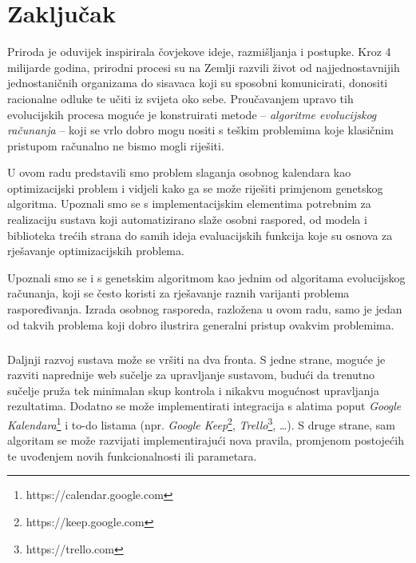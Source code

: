 \documentclass[times, utf8, zavrsni]{fer}
\begin{document}

\chapter{Zaključak}
Priroda je oduvijek inspirirala čovjekove ideje, razmišljanja i postupke. Kroz 4 milijarde godina, prirodni procesi su na Zemlji razvili život od najjednostavnijih jednostaničnih organizama do sisavaca koji su sposobni komunicirati, donositi racionalne odluke te učiti iz svijeta oko sebe. Proučavanjem upravo tih evolucijskih procesa moguće je konstruirati metode -- \textit{algoritme evolucijskog računanja} -- koji se vrlo dobro mogu nositi s teškim problemima koje klasičnim pristupom računalno ne bismo mogli riješiti.

U ovom radu predstavili smo problem slaganja osobnog kalendara kao optimizacijski problem i vidjeli kako ga se može riješiti primjenom genetskog algoritma. Upoznali smo se s implementacijskim elementima potrebnim za realizaciju sustava koji automatizirano slaže osobni raspored, od modela i biblioteka trećih strana do samih ideja evaluacijskih funkcija koje su osnova za rješavanje optimizacijskih problema.

Upoznali smo se i s genetskim algoritmom kao jednim od algoritama evolucijskog računanja, koji se često koristi za rješavanje raznih varijanti problema raspoređivanja. Izrada osobnog rasporeda, razložena u ovom radu, samo je jedan od takvih problema koji dobro ilustrira generalni pristup ovakvim problemima.

\paragraph{}
Daljnji razvoj sustava može se vršiti na dva fronta. S jedne strane, moguće je razviti naprednije web sučelje za upravljanje sustavom, budući da trenutno sučelje pruža tek minimalan skup kontrola i nikakvu mogućnost upravljanja rezultatima. Dodatno se može implementirati integracija s alatima poput \textit{Google Kalendara}\footnote{https://calendar.google.com} i to-do listama (npr. \textit{Google Keep}\footnote{https://keep.google.com}, \textit{Trello}\footnote{https://trello.com}, \dots). S druge strane, sam algoritam se može razvijati implementirajući nova pravila, promjenom postojećih te uvođenjem novih funkcionalnosti ili parametara.
\end{document}
